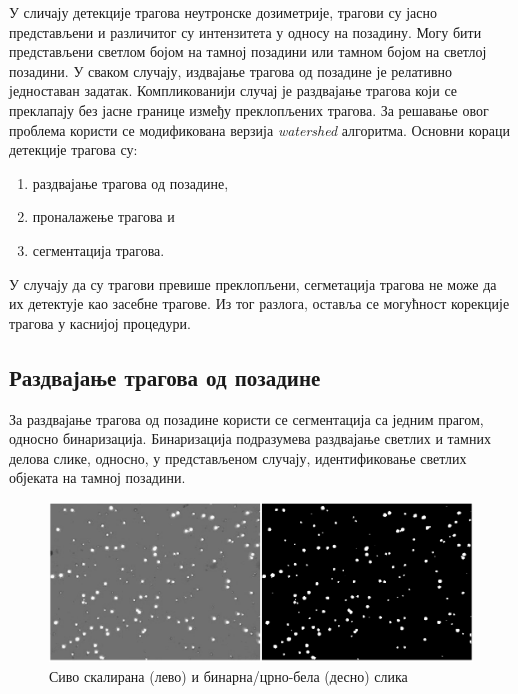 \documentclass[11pt,a4paper,serbian,oneside]{book}
\begin{document}
У сличају детекције трагова неутронске дозиметрије, трагови су јасно представљени и различитог су интензитета у односу на позадину. Могу бити представљени светлом бојом на тамној позадини или тамном бојом на светлој позадини. У сваком случају, издвајање трагова од позадине је релативно једноставан задатак. Компликованији случај је раздвајање трагова који се преклапају без јасне границе између преклопљених трагова. За решавање овог проблема користи се модификована верзија \textit{watershed} алгоритма. Основни кораци детекције трагова су:
\begin{enumerate}
  \item раздвајање трагова од позадине,
  \item проналажење трагова и
  \item сегментација трагова.
\end{enumerate}

У случају да су трагови превише преклопљени, сегметација трагова не може да их детектује као засебне трагове. Из тог разлога, оставља се могућност корекције трагова у каснијој процедури.

\subsection{Раздвајање трагова од позадине}

За раздвајање трагова од позадине користи се сегментација са једним прагом, односно бинаризација. Бинаризација подразумева раздвајање светлих и тамних делова слике, од\-нос\-но, у представљеном случају, идентификовање светлих објеката на тамној позадини.

\begin{figure}[htb]
\begin{center}
\leavevmode
\includegraphics[width=150mm]{images/binary.png}
\end{center}
\caption{Сиво скалирана (лево) и бинарна/црно-бела (десно) слика}
\label{fig:cv}
\end{figure}
\end{document}
